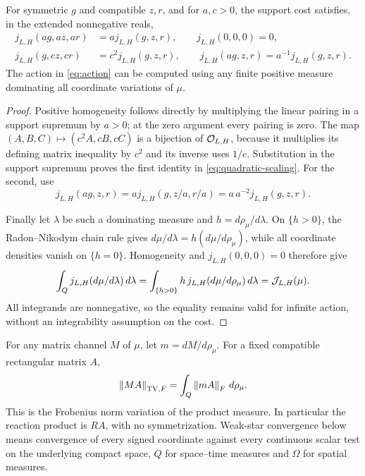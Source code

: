 \begin{lemma}\label{lem:scaling}
For symmetric $g$ and compatible $z,r$, and for $a,c>0$, the support cost
satisfies, in the extended nonnegative reals,
\begin{align}
 j_{L,H}(ag,az,ar)&=a j_{L,H}(g,z,r),\qquad j_{L,H}(0,0,0)=0,
                                                    \label{eq:homogeneous}\\
 j_{L,H}(g,cz,cr)&=c^2j_{L,H}(g,z,r),\qquad
 j_{L,H}(ag,z,r)=a^{-1}j_{L,H}(g,z,r).\label{eq:quadratic-scaling}
\end{align}
The action in \eqref{eq:action} can be computed using any finite positive
measure dominating all coordinate variations of $\mu$.
\end{lemma}
\begin{proof}
Positive homogeneity follows directly by multiplying the linear pairing
in a support supremum by $a>0$; at the zero argument every pairing is zero.
The map
$(A,B,C)\mapsto(c^2A,cB,cC)$ is a bijection of $\mathcal O_{L,H}$, because
it multiplies its defining matrix inequality by $c^2$ and its inverse
uses $1/c$. Substitution in the support supremum proves the first identity
in \eqref{eq:quadratic-scaling}. For the second, use
\[
 j_{L,H}(ag,z,r)=a j_{L,H}(g,z/a,r/a)
               =a\,a^{-2}j_{L,H}(g,z,r).
\]

Finally let $\lambda$ be such a dominating measure and
$h=d\rho_\mu/d\lambda$. On $\{h>0\}$, the Radon--Nikodym chain rule gives
$d\mu/d\lambda=h(d\mu/d\rho_\mu)$, while all coordinate densities vanish
on $\{h=0\}$. Homogeneity and $j_{L,H}(0,0,0)=0$ therefore give
\[
 \int_Q j_{L,H}(d\mu/d\lambda)\,d\lambda
 =\int_{\{h>0\}}h\,j_{L,H}(d\mu/d\rho_\mu)\,d\lambda
 =\mathcal J_{L,H}(\mu).
\]
All integrands are nonnegative, so the equality remains valid for infinite
action, without an integrability assumption on the cost.
\end{proof}

For any matrix channel $M$ of $\mu$, let $m=dM/d\rho_\mu$.
For a fixed compatible rectangular matrix $A$,
\begin{equation}\label{eq:variation}
 \left\lVert MA\right\rVert_{\operatorname{TV},F}=\int_Q\left\lVert mA\right\rVert_F\,d\rho_\mu.
\end{equation}
This is the Frobenius norm variation of the product measure. In
particular the reaction product is $RA$, with no symmetrization. Weak-star
convergence below means convergence of every signed coordinate against every
continuous scalar test on the underlying compact space, $Q$ for space--time
measures and $\Omega$ for spatial measures.
